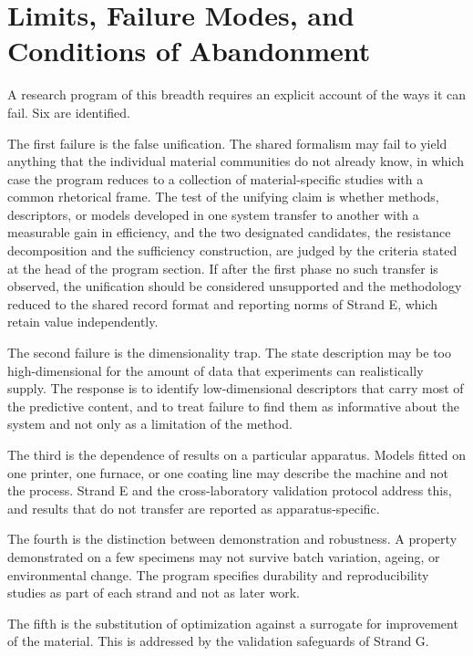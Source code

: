 \documentclass[11pt]{article}
\theoremstyle{definition}
\begin{document}
\section{Limits, Failure Modes, and Conditions of Abandonment}
\label{sec:limits}

A research program of this breadth requires an explicit account of the ways it can fail. Six are identified.

The first failure is the false unification. The shared formalism may fail to yield anything that the individual material communities do not already know, in which case the program reduces to a collection of material-specific studies with a common rhetorical frame. The test of the unifying claim is whether methods, descriptors, or models developed in one system transfer to another with a measurable gain in efficiency, and the two designated candidates, the resistance decomposition and the sufficiency construction, are judged by the criteria stated at the head of the program section. If after the first phase no such transfer is observed, the unification should be considered unsupported and the methodology reduced to the shared record format and reporting norms of Strand E, which retain value independently.

The second failure is the dimensionality trap. The state description may be too high-dimensional for the amount of data that experiments can realistically supply. The response is to identify low-dimensional descriptors that carry most of the predictive content, and to treat failure to find them as informative about the system and not only as a limitation of the method.

The third is the dependence of results on a particular apparatus. Models fitted on one printer, one furnace, or one coating line may describe the machine and not the process. Strand E and the cross-laboratory validation protocol address this, and results that do not transfer are reported as apparatus-specific.

The fourth is the distinction between demonstration and robustness. A property demonstrated on a few specimens may not survive batch variation, ageing, or environmental change. The program specifies durability and reproducibility studies as part of each strand and not as later work.

The fifth is the substitution of optimization against a surrogate for improvement of the material. This is addressed by the validation safeguards of Strand G.
\end{document}
